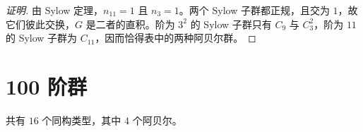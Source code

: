 \documentclass[UTF8,fontset=fandol,11pt,a4paper]{ctexart}
\begin{document}
\begin{proof}[证明]
由 Sylow 定理，$n_{11}=1$ 且 $n_{3}=1$。两个 Sylow 子群都正规，且交为 $1$，故它们彼此交换，$G$ 是二者的直积。阶为 $3^2$ 的 Sylow 子群只有 $C_{9}$ 与 $C_{3}^2$，阶为 $11$ 的 Sylow 子群为 $C_{11}$，因而恰得表中的两种阿贝尔群。
\end{proof}

\section*{100 阶群}\label{order:100}

共有 $16$ 个同构类型，其中 $4$ 个阿贝尔。

\begingroup\small\setlength{\tabcolsep}{3pt}\renewcommand{\arraystretch}{1.12}
\end{document}
